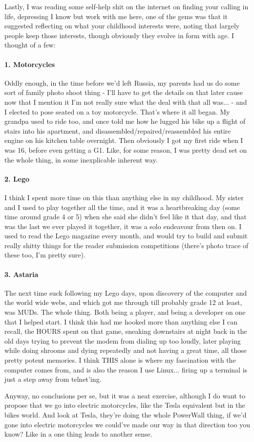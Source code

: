 \documentclass[12pt]{article}
\begin{document}
Lastly, I was reading some self-help shit on the internet on finding your calling in life, depressing I know but work with me here, one of the gems was that it suggested reflecting on what your childhood interests were, noting that largely people keep those interests, though obviously they evolve in form with age. I thought of a few:
\paragraph{1. Motorcycles} Oddly enough, in the time before we'd left Russia, my parents had us do some sort of family photo shoot thing - I'll have to get the details on that later cause now that I mention it I'm not really sure what the deal with that all was... - and I elected to pose seated on a toy motorcycle. That's where it all began. My grandpa used to ride too, and once told me how he lugged his bike up a flight of stairs into his apartment, and disassembled/repaired/reassembled his entire engine on his kitchen table overnight. Then obviously I got my first ride when I was 16, before even getting a G1. Like, for some reason, I was pretty dead set on the whole thing, in some inexplicable inherent way. 
\paragraph{2. Lego} I think I spent more time on this than anything else in my childhood. My sister and I used to play together all the time, and it was a heartbreaking day (some time around grade 4 or 5) when she said she didn't feel like it that day, and that was the last we ever played it together, it was a solo endeavour from then on. I used to read the Lego magazine every month, and would try to build and submit really shitty things for the reader submission competitions (there's photo trace of these too, I'm pretty sure). 
\paragraph{3. Astaria} The next time suck following my Lego days, upon discovery of the computer and the world wide webs, and which got me through till probably grade 12 at least, was MUDs. The whole thing. Both being a player, and being a developer on one that I helped start. I think this had me hooked more than anything else I can recall, the HOURS spent on that game, sneaking downstairs at night back in the old days trying to prevent the modem from dialing up too loudly, later playing while doing shrooms and dying repeatedly and not having a great time, all those pretty potent memories. I think THIS alone is where my fascination with the computer comes from, and is also the reason I use Linux... firing up a terminal is just a step away from telnet'ing. 

Anyway, no conclusions per se, but it was a neat exercise, although I do want to propose that we go into electric motorcycles, like the Tesla equivalent but in the bikes world. And look at Tesla, they're doing the whole PowerWall thing, if we'd gone into electric motorcycles we could've made our way in that direction too you know? Like in a one thing leads to another sense. 
\end{document}
